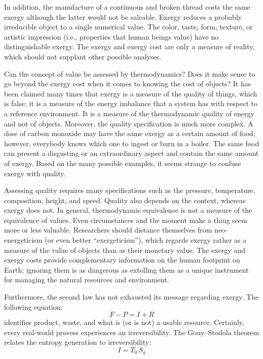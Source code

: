\documentclass[energies,article,submit,moreauthors,pdftex]{Definitions/mdpi}
\begin{document}
In addition, the manufacture of a continuous and broken thread costs the same exergy although the latter would not be saleable. Exergy reduces a probably irreducible object to a single numerical value. The color, taste, form, texture, or artistic impression (i.e., properties that human beings value) have no distinguishable exergy. The exergy and exergy cost are only a measure of reality, which should not supplant other possible analyses.

Can the concept of value be assessed by thermodynamics? Does it make sense to go beyond the exergy cost when it comes to knowing the cost of objects? It has been claimed many times that exergy is a measure of the quality of things, which is false; it is a measure of the energy imbalance that a system has with respect to a reference environment. It is a measure of the thermodynamic quality of energy and not of objects. Moreover, the quality specification is much more complex. A dose of carbon monoxide may have the same exergy as a certain amount of food; however, everybody knows which one to ingest or burn in a boiler. The same food can present a disgusting or an extraordinary aspect and contain the same amount of exergy. Based on the many possible examples, it seems strange to confuse exergy with quality.

Assessing quality requires many specifications such as the pressure, temperature, composition, height, and speed. Quality also depends on the context, whereas exergy does not. In general, thermodynamic equivalence is not a measure of the equivalence of values. Even circumstances and the moment make a thing seem more or less valuable. Researchers should distance themselves from neo-energeticism (or even better “exergeticism”), which regards exergy rather as a measure of the value of objects than as their monetary value. The exergy and exergy costs provide complementary information on the human footprint on Earth; ignoring them is as dangerous as extolling them as a unique instrument for managing the natural resources and environment.
 
Furthermore, the second law has not exhausted its message regarding exergy. The following equation:
\begin{equation}
   F - P = I + R
\label{eq:FPR}
\end{equation}
identifies product, waste, and what is (or is not) a usable resource. Certainly, every real-world process experiences an irreversibility. The Gouy–Stodola theorem relates the entropy generation to irreversibility:
\begin{equation}
    I = T_0\,S_g
\label{eq:gouystodola}
\end{equation}
\end{document}

